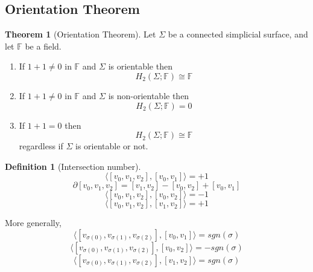\documentclass[a4paper,14pt]{extarticle}
\theoremstyle{definition}
\newtheorem*{theorem}{Theorem}
\newtheorem*{definition}{Definition}
\begin{document}
\subsection{Orientation Theorem}
\begin{theorem}[Orientation Theorem]
	Let $\Sigma$ be a connected simplicial surface, and let $\mathbb{F}$ be a field.
	\begin{enumerate}
		\item If $1+1\neq0$ in $\mathbb{F}$ and $\Sigma$ is orientable then
		\[H_2(\Sigma;\mathbb{F})\cong\mathbb{F}\]
		\item If $1+1\neq0$ in $\mathbb{F}$ and $\Sigma$ is non-orientable then 
		\[H_2(\Sigma;\mathbb{F})=0\]
		\item If $1+1=0$ then \[H_2(\Sigma;\mathbb{F})\cong\mathbb{F}\] regardless if $\Sigma$
		is orientable or not.
	\end{enumerate}
\end{theorem}

\begin{definition}[Intersection number]
	\[\langle[v_0,v_1,v_2],[v_0,v_1]\rangle=+1\]
	\[\partial[v_0,v_1,v_2]=[v_1,v_2]-[v_0,v_2]+[v_0,v_1]\]
	\[\langle[v_0,v_1,v_2],[v_0,v_2]\rangle=-1\]
	\[\langle[v_0,v_1,v_2],[v_1,v_2]\rangle=+1\]

	\noindent More generally,
	\[\langle[v_{\sigma(0)},v_{\sigma(1)},v_{\sigma(2)}],[v_0,v_1]\rangle=sgn(\sigma)\]
	\[\langle[v_{\sigma(0)},v_{\sigma(1)},v_{\sigma(2)}],[v_0,v_2]\rangle=-sgn(\sigma)\]
	\[\langle[v_{\sigma(0)},v_{\sigma(1)},v_{\sigma(2)}],[v_1,v_2]\rangle=sgn(\sigma)\]
\end{definition}
\end{document}
